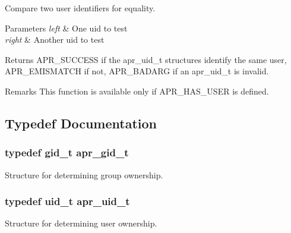 Compare two user identifiers for equality. 
\begin{DoxyParams}{Parameters}
{\em left} & One uid to test \\
\hline
{\em right} & Another uid to test \\
\hline
\end{DoxyParams}
\begin{DoxyReturn}{Returns}
A\-P\-R\-\_\-\-S\-U\-C\-C\-E\-S\-S if the apr\-\_\-uid\-\_\-t structures identify the same user, A\-P\-R\-\_\-\-E\-M\-I\-S\-M\-A\-T\-C\-H if not, A\-P\-R\-\_\-\-B\-A\-D\-A\-R\-G if an apr\-\_\-uid\-\_\-t is invalid. 
\end{DoxyReturn}
\begin{DoxyRemark}{Remarks}
This function is available only if A\-P\-R\-\_\-\-H\-A\-S\-\_\-\-U\-S\-E\-R is defined. 
\end{DoxyRemark}


\subsection{Typedef Documentation}
\hypertarget{group__apr__user_ga22e9e224e984f837f3e276833e2f3a55}{
\subsubsection[{apr\-\_\-gid\-\_\-t}]{\setlength{\rightskip}{0pt plus 5cm}typedef gid\-\_\-t {\bf apr\-\_\-gid\-\_\-t}}}\label{group__apr__user_ga22e9e224e984f837f3e276833e2f3a55}
Structure for determining group ownership. \hypertarget{group__apr__user_gad1aa508f584bc230acf4f68ba4fc4de7}{
\subsubsection[{apr\-\_\-uid\-\_\-t}]{\setlength{\rightskip}{0pt plus 5cm}typedef uid\-\_\-t {\bf apr\-\_\-uid\-\_\-t}}}\label{group__apr__user_gad1aa508f584bc230acf4f68ba4fc4de7}
Structure for determining user ownership. 


